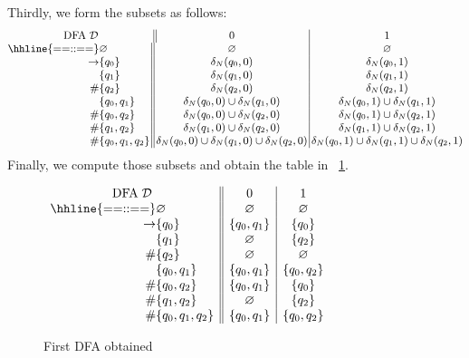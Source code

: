 Thirdly, we form the subsets as follows:
\begin{equation*}
\small
\begin{array}{@{}r@{}l@{\,}||@{\,}c@{\,}|@{\,}c@{}}
\multicolumn{2}{c||}{\text{DFA} \; \mathcal{D}} & 0 & 1\\
\hhline{==::==}
            & \varnothing & \varnothing & \varnothing\\
\rightarrow & \{q_0\} & \delta_N(q_0, 0) & \delta_N(q_0, 1)\\
            & \{q_1\} & \delta_N(q_1, 0) & \delta_N(q_1, 1)\\
         \# & \{q_2\} & \delta_N(q_2, 0) & \delta_N(q_2, 1)\\
            & \{q_0, q_1\} & \delta_N(q_0,0) \cup \delta_N(q_1,0)
                           & \delta_N(q_0,1) \cup \delta_N(q_1,1)\\
         \# & \{q_0, q_2\} & \delta_N(q_0,0) \cup \delta_N(q_2,0)
                           & \delta_N(q_0,1) \cup \delta_N(q_2,1)\\
         \# & \{q_1, q_2\} & \delta_N(q_1,0) \cup \delta_N(q_2,0)
                           & \delta_N(q_1,1) \cup \delta_N(q_2,1)\\
         \# & \{q_0, q_1, q_2\}
            & \delta_N(q_0,0) \cup \delta_N(q_1,0) \cup \delta_N(q_2,0)
            & \delta_N(q_0,1) \cup \delta_N(q_1,1) \cup \delta_N(q_2,1)
\end{array}
\end{equation*}
Finally, we compute those subsets and obtain the table in
\fig~\ref{fig:first_dfa_table}.
\begin{figure}[t]
\centering
\(\begin{array}{r@{}l||c|c}
\multicolumn{2}{c||}{\text{DFA} \; \mathcal{D}} & 0 & 1\\
\hhline{==::==}
            & \varnothing & \varnothing & \varnothing\\
\rightarrow & \{q_0\} & \{q_0, q_1\} & \{q_0\}\\
            & \{q_1\} & \varnothing & \{q_2\}\\
         \# & \{q_2\} & \varnothing & \varnothing\\
            & \{q_0, q_1\} & \{q_0,q_1\} & \{q_0,q_2\}\\
         \# & \{q_0, q_2\} & \{q_0,q_1\} & \{q_0\}\\
         \# & \{q_1, q_2\} & \varnothing & \{q_2\}\\
         \# & \{q_0, q_1, q_2\} & \{q_0, q_1\} & \{q_0,q_2\}
\end{array}\)
\caption{First DFA obtained}
\label{fig:first_dfa_table}
\end{figure}
